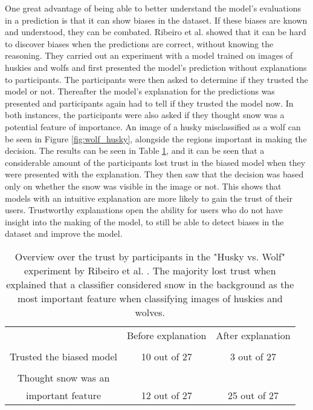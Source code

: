 


One great advantage of being able to better understand the model's evaluations in a prediction is that it can show biases in the dataset. If these biases are known and understood, they can be combated. Ribeiro et al. \cite{ribeiroWhyShouldTrust2016} showed that it can be hard to discover biases when the predictions are correct, without knowing the reasoning. They carried out an experiment with a model trained on images of huskies and wolfs and first presented the model's prediction without explanations to participants. The participants were then asked to determine if they trusted the model or not. Thereafter the model's explanation for the predictions was presented and participants again had to tell if they trusted the model now. In both instances, the participants were also asked if they thought snow was a potential feature of importance. An image of a husky misclassified as a wolf can be seen in Figure \ref{fig:wolf_husky}, alongside the regions important in making the decision. The results can be seen in Table \ref{table:husky_vs_wolf}, and it can be seen that a considerable amount of the participants lost trust in the biased model when they were presented with the explanation. They then saw that the decision was based only on whether the snow was visible in the image or not. This shows that models with an intuitive explanation are more likely to gain the trust of their users. Trustworthy explanations open the ability for users who do not have insight into the making of the model, to still be able to detect biases in the dataset and improve the model. 

\begin{table}[htb]
    \centering
    \begin{tabular}{ c c c} 
     
               & Before explanation & After explanation\\ [0.5ex] 
        \Xhline{1.5pt} \\ 
            Trusted the biased model & 10 out of 27 & 3 out of 27 \\  [0.5ex]
        \hline  \\ 
            Thought snow was an \\ important feature & 12 out of 27 & 25 out of 27 \\ [1ex] 
        \hline
    \end{tabular}
    \caption[Overview over the trust by participants in the "Husky vs. Wolf" experiment by Ribeiro et al. \cite{ribeiroWhyShouldTrust2016}.]{Overview over the trust by participants in the "Husky vs. Wolf" experiment by Ribeiro et al. \cite{ribeiroWhyShouldTrust2016}. The majority lost trust when explained that a classifier considered snow in the background as the most important feature when classifying images of huskies and wolves.}
    \label{table:husky_vs_wolf}
\end{table}

